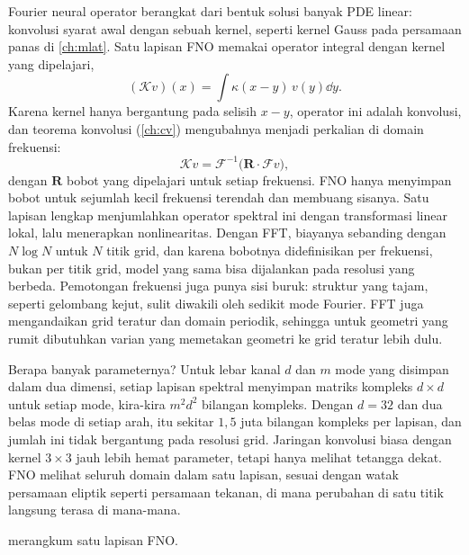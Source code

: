Fourier neural operator \citep{li2021} berangkat dari bentuk solusi banyak PDE linear: konvolusi syarat
awal dengan sebuah kernel, seperti kernel Gauss pada persamaan panas di \cref{ch:mlat}. Satu lapisan FNO
memakai operator integral dengan kernel yang dipelajari,
\begin{equation}
(\mathcal Kv)(x)=\int\kappa(x-y)\,v(y)\dd y.
\end{equation}
Karena kernel hanya bergantung pada selisih $x-y$, operator ini adalah konvolusi, dan teorema konvolusi
(\cref{ch:cv}) mengubahnya menjadi perkalian di domain frekuensi:
\begin{equation}
\mathcal Kv=\mathcal F^{-1}\big(\bm R\cdot\mathcal Fv\big),
\end{equation}
dengan $\bm R$ bobot yang dipelajari untuk setiap frekuensi. FNO hanya menyimpan bobot untuk sejumlah
kecil frekuensi terendah dan membuang sisanya. Satu lapisan lengkap menjumlahkan operator spektral ini
dengan transformasi linear lokal, lalu menerapkan nonlinearitas. Dengan FFT, biayanya sebanding dengan
$N\log N$ untuk $N$ titik grid, dan karena bobotnya didefinisikan per frekuensi, bukan per titik grid,
model yang sama bisa dijalankan pada resolusi yang berbeda. Pemotongan frekuensi juga punya sisi buruk:
struktur yang tajam, seperti gelombang kejut, sulit diwakili oleh sedikit mode Fourier. FFT juga mengandaikan grid
teratur dan domain periodik, sehingga untuk geometri yang rumit dibutuhkan varian yang memetakan geometri ke grid
teratur lebih dulu.

Berapa banyak parameternya? Untuk lebar kanal $d$ dan $m$ mode yang disimpan dalam dua dimensi, setiap lapisan
spektral menyimpan matriks kompleks $d\times d$ untuk setiap mode, kira-kira $m^2d^2$ bilangan kompleks. Dengan $d=32$
dan dua belas mode di setiap arah, itu sekitar $1{,}5$ juta bilangan kompleks per lapisan, dan jumlah ini tidak
bergantung pada resolusi grid. Jaringan konvolusi biasa dengan kernel $3\times3$ jauh lebih hemat parameter, tetapi
hanya melihat tetangga dekat. FNO melihat seluruh domain dalam satu lapisan, sesuai dengan watak persamaan eliptik
seperti persamaan tekanan, di mana perubahan di satu titik langsung terasa di mana-mana.

 merangkum satu lapisan FNO.

